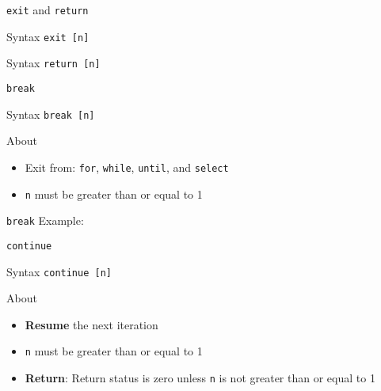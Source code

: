 \documentclass[10pt, compress, aspectratio=169]{beamer}
\begin{document}
\begin{frame}{\texttt{exit} and \texttt{return}}
  \begin{alertblock}{Syntax}
    \texttt{exit [n]}
  \end{alertblock}

  \begin{alertblock}{Syntax}
    \texttt{return [n]}
  \end{alertblock}
\end{frame}

\begin{frame}{\texttt{break}}
  \begin{alertblock}{Syntax}
    \texttt{break [n]}
  \end{alertblock}

  \begin{exampleblock}{About}
    \begin{itemize}
      \item Exit from: \texttt{for}, \texttt{while},
            \texttt{until}, and \texttt{select}
      \item \texttt{n} must be greater than or equal to 1
    \end{itemize}
  \end{exampleblock}
\end{frame}

\begin{frame}{\texttt{break}}
  Example:
  
\end{frame}

\begin{frame}{\texttt{continue}}
  \begin{alertblock}{Syntax}
    \texttt{continue [n]}
  \end{alertblock}

  \begin{exampleblock}{About}
    \begin{itemize}
      \item \textbf{Resume} the next iteration
      \item \texttt{n} must be greater than or equal to 1
      \item \textbf{Return}: Return status is zero unless \texttt{n} is not
            greater than or equal to 1
    \end{itemize}
  \end{exampleblock}
\end{frame}
\end{document}

